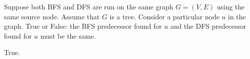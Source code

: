 \begin{prob}
    Suppose both BFS and DFS are run on the same graph $G = (V, E)$ using the
    same source node. Assume that $G$ is a tree. Consider a particular node $u$
    in the graph. True or False: the BFS predecessor found for $u$ and the DFS
    predecessor found for $u$ must be the same.

    \Tf{}

    \begin{soln}
        True.
    \end{soln}

\end{prob}
